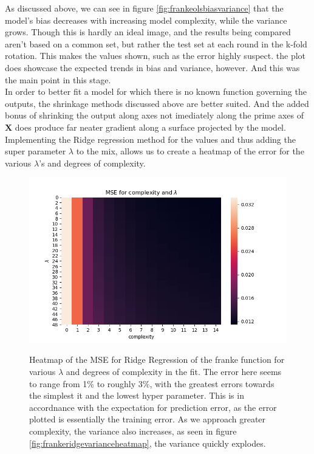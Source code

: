 \documentclass[ 12pt, a4paper ]{article}
\begin{document}
As discussed above, we can see in figure \ref{fig:frankeolsbiasvariance} that the model's 
bias decreases with increasing model complexity, while the variance grows. Though this is 
hardly an ideal image, and the results being compared aren't based on a common set, but 
rather the test set at each round in the k-fold rotation. This makes the values shown, such 
as the error highly suspect. the plot does showcase the expected trends in bias and variance, 
however. And this was the main point in this stage. \\

In order to better fit a model for which there is no known function governing the outputs, 
the shrinkage methods discussed above are better suited. And the added bonus of shrinking the
output along axes not imediately along the prime axes of $\mathbf{X}$ does produce far neater 
gradient along a surface projected by the model. Implementing the Ridge regression method for 
the values and thus adding the super parameter $\lambda$ to the mix, allows us to create a 
heatmap of the error for the various $\lambda$'s and degrees of complexity.

\begin{figure}[H]
\includegraphics[scale=0.7]{frankeridgemseheatmap.png}
\label{fig:frankeridgemseheatmap}
\caption{
    Heatmap of the MSE for Ridge Regression of the franke function for various $\lambda$ and 
    degrees of complexity in the fit. The error here seems to range from 1\% to roughly 3\%, 
    with the greatest errors towards the simplest it and the lowest hyper parameter. This is 
    in accordnance with the expectation for prediction error, as the error plotted is essentially
    the training error. As we approach greater complexity, the variance also increases, as seen
    in figure \ref{fig:frankeridgevarianceheatmap}, the variance quickly explodes. 
}
\end{figure}
\end{document}
